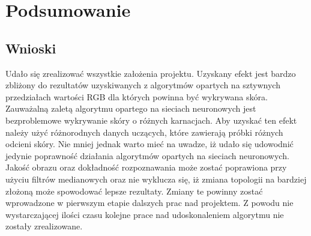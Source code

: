 \chapter{Podsumowanie}
\label{cha:podsumowanie}

\section{Wnioski}
Udało się zrealizować wszystkie założenia projektu. Uzyskany efekt jest bardzo zbliżony do rezultatów uzyskiwanych z algorytmów opartych na sztywnych przedziałach wartości RGB dla których powinna być wykrywana skóra. Zauważalną zaletą algorytmu opartego na sieciach neuronowych jest bezproblemowe wykrywanie skóry o różnych karnacjach. Aby uzyskać ten efekt należy użyć różnorodnych danych uczących, które zawierają próbki różnych odcieni skóry. Nie mniej jednak warto mieć na uwadze, iż udało się udowodnić jedynie poprawność działania algorytmów opartych na sieciach neuronowych. Jakość obrazu oraz dokładność rozpoznawania może zostać poprawiona przy użyciu filtrów medianowych oraz nie wyklucza się, iż zmiana topologii na bardziej złożoną może spowodować lepsze rezultaty. Zmiany te powinny zostać wprowadzone w pierwszym etapie dalszych prac nad projektem. Z powodu nie wystarczającej ilości czasu kolejne prace nad udoskonaleniem algorytmu nie zostały zrealizowane. 